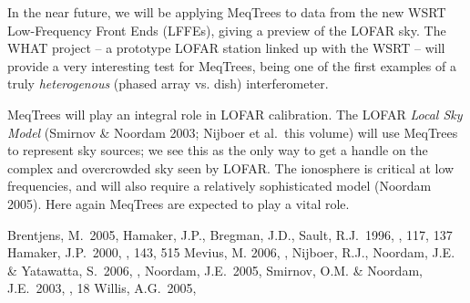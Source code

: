 \documentclass[11pt,twoside]{article}  %
\begin{document}
In the near future, we will be applying MeqTrees to data from the new WSRT
Low-Frequency Front Ends (LFFEs), giving a preview of the LOFAR sky. The WHAT
project -- a prototype LOFAR station linked up with the WSRT -- will provide
a very interesting test for MeqTrees, being one of the first examples of a truly
{\em heterogenous} (phased array vs. dish) interferometer.

MeqTrees will play an integral role in LOFAR calibration. The LOFAR {\em Local
Sky Model} (Smirnov \& Noordam 2003; Nijboer et al.\ this volume) will use
MeqTrees to represent sky sources; we see this as the only way to get a handle
on the complex and overcrowded sky seen by LOFAR. The ionosphere is critical at
low frequencies, and will also require a relatively sophisticated model (Noordam
2005). Here again MeqTrees are expected to play a vital role.

\begin{references}
 Brentjens, M.\ 2005, 
 Hamaker, J.P., Bregman, J.D., Sault, R.J.\ 1996, \aaps, 117, 137
 Hamaker, J.P.\ 2000, \aaps, 143, 515
 Mevius, M. 2006, \adassxv, 
 Nijboer, R.J., Noordam, J.E. \& Yatawatta, S.\ 2006, \adassxv,
 Noordam, J.E.\ 2005, 
 Smirnov, O.M. \& Noordam, J.E.\ 2003, \adassxiii, 18
 Willis, A.G.\ 2005, 
\end{references}
\end{document}
